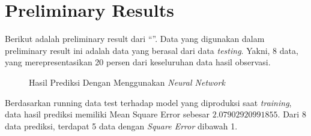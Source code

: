\chapter{Preliminary Results}
Berikut adalah preliminary result dari ``{\Title}''. Data yang digunakan dalam preliminary result ini adalah data yang berasal dari data \emph{testing}. Yakni, 8 data, yang merepresentasikan 20 persen dari keseluruhan data hasil  observasi.

\begin{figure}[ht]
  \begin{center}
    \caption{Hasil Prediksi Dengan Menggunakan \emph{Neural Network}}
  \end{center}
\end{figure}

Berdasarkan running data test terhadap model yang diproduksi saat \emph{training}, data hasil prediksi memiliki Mean Square Error sebesar $2.07902920991855$. Dari 8 data prediksi, terdapat 5 data dengan \emph{Square Error} dibawah 1.
